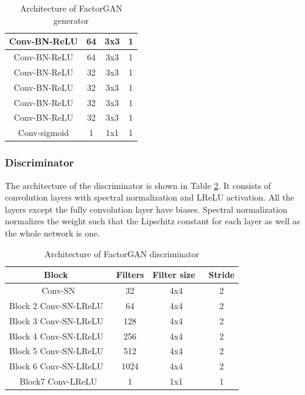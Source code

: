 \begin{table}[H]
\begin{tabular}{|c|c|c|c|}
Conv-BN-ReLU    & 64               & 3x3                   & 1                \\ 
\hline
Conv-BN-ReLU    & 64               & 3x3                   & 1                \\ 
\hline
Conv-BN-ReLU    & 32               & 3x3                   & 1                \\ 
\hline
Conv-BN-ReLU    & 32               & 3x3                   & 1                \\ 
\hline
Conv-BN-ReLU    & 32               & 3x3                   & 1                \\ 
\hline
Conv-BN-ReLU    & 32               & 3x3                   & 1                \\ 
\hline
Conv-sigmoid    & 1                & 1x1                   & 1                \\
\hline
\end{tabular}
\caption{Architecture of FactorGAN generator}
\label{tab:tab5}
\end{table}

\subsubsection*{Discriminator}
The architecture of the discriminator is shown in Table \ref{tab:tab6}. It consists of convolution layers with spectral normalization and LReLU activation. All the layers except the fully convolution layer have biases. Spectral normalization normalizes the weight such that the Lipschitz constant for each layer as well as the whole network is one.
\begin{table}[H]
\centering
\begin{tabular}{|c|c|c|c|} 
\hline
\textbf{Block~}        & \textbf{Filters} & \textbf{Filter size~} & \textbf{Stride}  \\ 
\hline
Conv-SN                & 32               & 4x4                   & 2                \\ 
\hline
Block 2 Conv-SN-LReLU~ & 64               & 4x4                   & 2                \\ 
\hline
Block 3 Conv-SN-LReLU~ & 128              & 4x4                   & 2                \\ 
\hline
Block 4 Conv-SN-LReLU~ & 256              & 4x4                   & 2                \\ 
\hline
Block 5 Conv-SN-LReLU~ & 512              & 4x4                   & 2                \\ 
\hline
Block 6 Conv-SN-LReLU~ & 1024             & 4x4                   & 2                \\ 
\hline
Block7 Conv-LReLU      & 1                & 1x1                   & 1                \\
\hline
\end{tabular}
\caption{Architecture of FactorGAN discriminator}
\label{tab:tab6}
\end{table}

